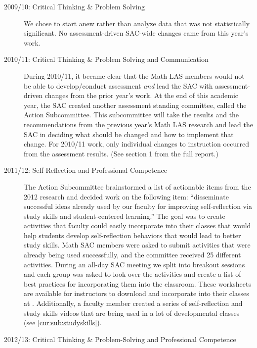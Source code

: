 \begin{description}
\item[2009/10: Critical Thinking \& Problem Solving]

We chose to start anew rather than analyze data that was not statistically
significant.  No assessment-driven SAC-wide changes came from this year's work.

\item[2010/11:  Critical Thinking \& Problem Solving and Communication]

During 2010/11, it became clear that the Math LAS members would not be able to
develop/conduct assessment \emph{and} lead the SAC with assessment-driven
changes from the prior year's work.  At the end of this academic year, the SAC
created another assessment standing committee, called the Action Subcommittee.
This subcommittee will take the results and the recommendations from the
previous year's Math LAS research and lead the SAC in deciding what should be
changed and how to implement that change.  For 2010/11 work, only individual
changes to instruction occurred from the assessment results.  (See section 1
from the full report.) 

\item[2011/12: Self Reflection and Professional Competence]

The Action Subcommittee brainstormed a list of actionable items from the 2012
research and decided work on the following item: ``disseminate successful ideas
already used by our faculty for improving self-reflection via study skills and
student-centered learning.''  The goal was to create activities that faculty
could easily incorporate into their classes that would help students develop
self-reflection behaviors that would lead to better study skills.  Math SAC
members were asked to submit activities that were already being used
successfully, and the committee received 25 different activities.  During an
all-day SAC meeting we split into breakout sessions and each group was asked to
look over the activities and create a list of best practices for incorporating
them into the classroom. These worksheets are available for instructors to
download and incorporate into their classes at \cite{selfcenteredlearning}.
Additionally, a faculty member created a series of self-reflection and study
skills videos that are being used in a lot of developmental classes (see
\vref{cur:sub:studyskills}).

\item[2012/13:  Critical Thinking \& Problem-Solving and Professional Competence]


\end{description}
